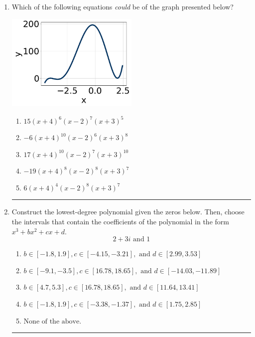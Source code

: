 \documentclass[14pt]{extbook}
\newcommand{\litem}[1]{\item#1\hspace*{-1cm}\rule{\textwidth}{0.4pt}}
\begin{document}
\begin{enumerate}
{\begin{enumerate}[label=\Alph*.]
\end{enumerate} }
\litem{
Which of the following equations \textit{could} be of the graph presented below?
\begin{center}
    \includegraphics[width=0.5\textwidth]{../Figures/polyGraphToFunctionC.png}
\end{center}
\begin{enumerate}[label=\Alph*.]
\item \( 15(x + 4)^{6} (x - 2)^{7} (x + 3)^{5} \)
\item \( -6(x + 4)^{10} (x - 2)^{6} (x + 3)^{8} \)
\item \( 17(x + 4)^{10} (x - 2)^{7} (x + 3)^{10} \)
\item \( -19(x + 4)^{8} (x - 2)^{8} (x + 3)^{7} \)
\item \( 6(x + 4)^{4} (x - 2)^{8} (x + 3)^{7} \)

\end{enumerate} }
\litem{
Construct the lowest-degree polynomial given the zeros below. Then, choose the intervals that contain the coefficients of the polynomial in the form $x^3+bx^2+cx+d$.\[ 2 + 3 i \text{ and } 1 \]\begin{enumerate}[label=\Alph*.]
\item \( b \in [-1.8, 1.9], c \in [-4.15, -3.21], \text{ and } d \in [2.99, 3.53] \)
\item \( b \in [-9.1, -3.5], c \in [16.78, 18.65], \text{ and } d \in [-14.03, -11.89] \)
\item \( b \in [4.7, 5.3], c \in [16.78, 18.65], \text{ and } d \in [11.64, 13.41] \)
\item \( b \in [-1.8, 1.9], c \in [-3.38, -1.37], \text{ and } d \in [1.75, 2.85] \)
\item \( \text{None of the above.} \)


\end{enumerate}}
\end{enumerate}
\end{document}
